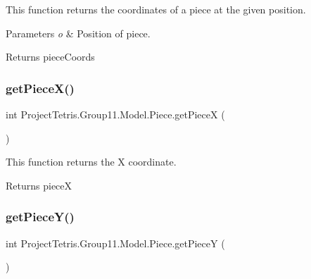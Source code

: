 This function returns the coordinates of a piece at the given position. 


\begin{DoxyParams}{Parameters}
{\em o} & Position of piece. \\
\hline
\end{DoxyParams}
\begin{DoxyReturn}{Returns}
piece\+Coords 
\end{DoxyReturn}
\hypertarget{class_project_tetris_1_1_group11_1_1_model_1_1_piece_a018dce64b98650107e8871e23dd1e152}{}\label{class_project_tetris_1_1_group11_1_1_model_1_1_piece_a018dce64b98650107e8871e23dd1e152} 
\subsubsection{\texorpdfstring{get\+Piece\+X()}{getPieceX()}}
{\footnotesize\ttfamily int Project\+Tetris.\+Group11.\+Model.\+Piece.\+get\+PieceX (\begin{DoxyParamCaption}{ }\end{DoxyParamCaption})}



This function returns the X coordinate. 

\begin{DoxyReturn}{Returns}
pieceX 
\end{DoxyReturn}
\hypertarget{class_project_tetris_1_1_group11_1_1_model_1_1_piece_a4c4c4dacf31d9824f2a223a722833b55}{}\label{class_project_tetris_1_1_group11_1_1_model_1_1_piece_a4c4c4dacf31d9824f2a223a722833b55} 
\subsubsection{\texorpdfstring{get\+Piece\+Y()}{getPieceY()}}
{\footnotesize\ttfamily int Project\+Tetris.\+Group11.\+Model.\+Piece.\+get\+PieceY (\begin{DoxyParamCaption}{ }\end{DoxyParamCaption})}



